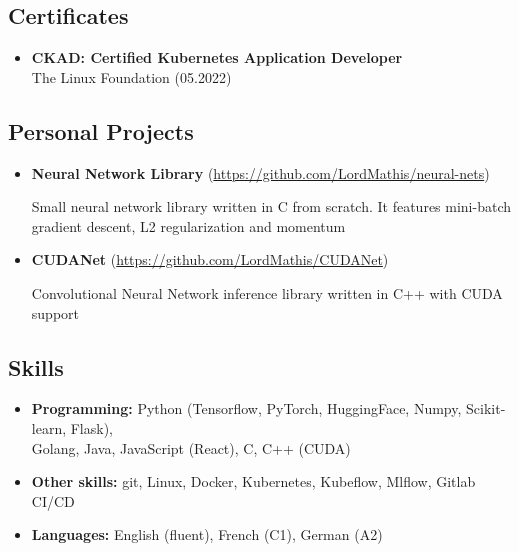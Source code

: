 \documentclass[a4paper,12pt]{article}
\begin{document}
{\color{myblue}
\subsection*{Certificates}\label{certificates}
}
\begin{itemize}
    \item   
    \textbf{CKAD: Certified Kubernetes Application Developer}\\
     The Linux Foundation \hfill (05.2022)
\end{itemize}

{\color{myblue}
\subsection*{Personal Projects}\label{projects}
}
\begin{itemize}
\item
    \textbf{Neural Network Library} (\href{https://github.com/LordMathis/neural-nets}{https://github.com/LordMathis/neural-nets})

    Small neural network library written in C from scratch. It features mini-batch gradient descent, L2 regularization and momentum

\item 
    \textbf{CUDANet} (\href{https://github.com/LordMathis/GitEcho}{https://github.com/LordMathis/CUDANet})

    Convolutional Neural Network inference library written in C++ with CUDA support
\end{itemize}

{\color{myblue}
\subsection*{Skills}\label{skills}
}
\begin{itemize}
\setlength\itemsep{0.2em} %
\item
  \textbf{Programming:} Python (Tensorflow, PyTorch, HuggingFace, Numpy, Scikit-learn, Flask), \\ Golang, Java, JavaScript (React), C, C++ (CUDA)
\item
  \textbf{Other skills:} git, Linux, Docker, Kubernetes, Kubeflow, Mlflow, Gitlab CI/CD
\item
  \textbf{Languages:} English (fluent), French (C1), German (A2)
\end{itemize}
\end{document}
